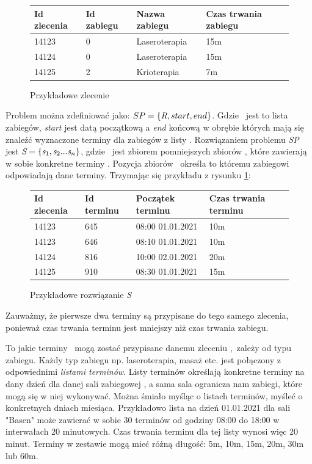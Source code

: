\begin{figure}[h]
	\centering
	\begin{tabular}{ l l l l }
	Id zlecenia & Id zabiegu & Nazwa zabiegu & Czas trwania zabiegu \\
	\hline
	14123 & 0 & Laseroterapia & 15m \\
	14124 & 0 & Laseroterapia & 15m \\
	14125 & 2 & Krioterapia & 7m \\
	\end{tabular}
	\caption{Przykładowe zlecenie \sRef}
	\label{example-referral}
\end{figure}

Problem można zdefiniować jako: \emph{$SP=\{\emph{R}, start, end\}$}. Gdzie \sRef\
jest to lista zabiegów, \emph{start} jest datą początkową a \emph{end} końcową w
obrębie których mają się znaleźć wyznaczone terminy dla zabiegów z listy \sRef.
Rozwiązaniem problemu \emph{SP} jest
\emph{$\emph{S}=\{\emph{s}_1,\emph{s}_2...\emph{s}_n\}$}, gdzie \sSol\ jest
zbiorem pomniejszych zbiorów \sTermSet, które zawierają w sobie konkretne terminy
\sTerm. Pozycja zbiorów \sTermSet\ określa to któremu zabiegowi odpowiadają dane
terminy. Trzymając się przykładu z rysunku \ref{example-referral}:

\begin{figure}[h]
	\centering
	\begin{tabular}{ l l l l }
	Id zlecenia & Id terminu & Początek terminu & Czas trwania terminu \\
	\hline
	14123 & 645 & 08:00 01.01.2021 & 10m \\
	14123 & 646 & 08:10 01.01.2021 & 10m \\
	14124 & 816 & 10:00 02.01.2021 & 20m \\
	14125 & 910 & 08:30 01.01.2021 & 15m \\
	\end{tabular}
	\caption{Przykładowe rozwiązanie \emph{S}}
	\label{example-solution}
\end{figure}

Zauważmy, że pierwsze dwa terminy są przypisane do tego samego zlecenia,
ponieważ czas trwania terminu jest mniejszy niż czas trwania zabiegu.

To jakie terminy \sTerm\ mogą zostać przypisane danemu zleceniu \sSubRef,\
zależy od typu zabiegu. Każdy typ zabiegu np. laseroterapia, masaż etc. jest
połączony z odpowiednimi \emph{listami terminów}. Listy terminów określają
konkretne terminy na dany dzień dla danej sali zabiegowej \sPlace, a sama sala
ogranicza nam zabiegi, które mogą się w niej wykonywać. Można śmiało myśląc o
listach terminów, myśleć o konkretnych dniach miesiąca. Przykładowo lista na
dzień 01.01.2021 dla sali "Basen" może zawierać w sobie 30 terminów od godziny 08:00
do 18:00 w interwałach 20 minutowych. Czas trwania terminu dla tej listy wynosi
więc 20 minut. Terminy w zestawie mogą mieć różną długość: 5m, 10m, 15m, 20m, 30m
lub 60m. %

